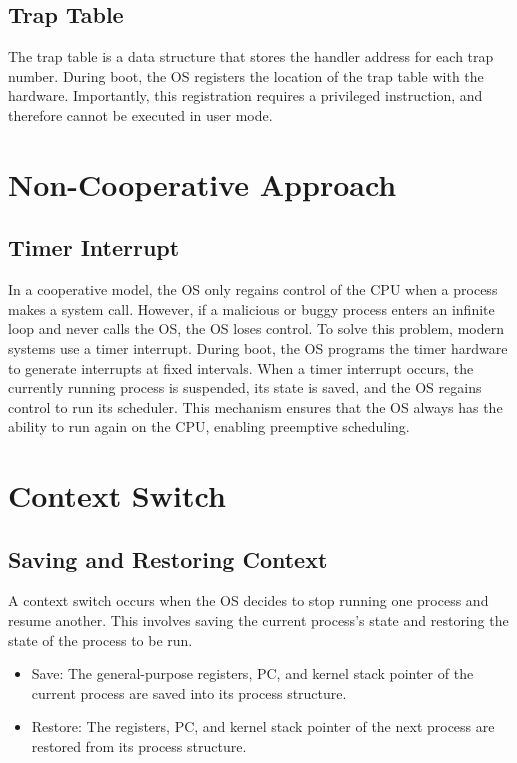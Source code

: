 \subsection{Trap Table}
The trap table is a data structure that stores the handler address for each trap number.
During boot, the OS registers the location of the trap table with the hardware.
Importantly, this registration requires a privileged instruction, and therefore cannot be executed in user mode.

\section{Non-Cooperative Approach}

\subsection{Timer Interrupt}
In a cooperative model, the OS only regains control of the CPU when a process makes a system call.
However, if a malicious or buggy process enters an infinite loop and never calls the OS, the OS loses control.
To solve this problem, modern systems use a timer interrupt.
During boot, the OS programs the timer hardware to generate interrupts at fixed intervals.
When a timer interrupt occurs, the currently running process is suspended, its state is saved, and the OS regains control to run its scheduler.
This mechanism ensures that the OS always has the ability to run again on the CPU, enabling preemptive scheduling.

\section{Context Switch}

\subsection{Saving and Restoring Context}
A context switch occurs when the OS decides to stop running one process and resume another.
This involves saving the current process’s state and restoring the state of the process to be run.
\begin{itemize}
    \item Save: The general-purpose registers, PC, and kernel stack pointer of the current process are saved into its process structure.
    \item Restore: The registers, PC, and kernel stack pointer of the next process are restored from its process structure.
\end{itemize}


